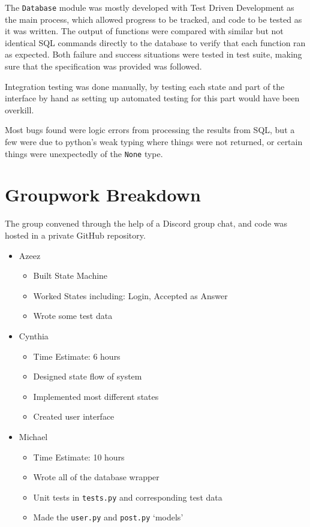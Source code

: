 \documentclass{article}
\begin{document}
The \verb|Database| module was mostly developed with Test Driven Development as the main process, which allowed progress to be tracked, and code to be tested as it was written. The output of functions were compared with similar but not identical SQL commands directly to the database to verify that each function ran as expected. Both failure and success situations were tested in test suite, making sure that the specification was provided was followed.

Integration testing was done manually, by testing each state and part of the interface by hand as setting up automated testing for this part would have been overkill.

Most bugs found were logic errors from processing the results from SQL, but a few were due to python's weak typing where things were not returned, or certain things were unexpectedly of the \verb|None| type.

\section{Groupwork Breakdown}

The group convened through the help of a Discord group chat, and code was hosted in a private GitHub repository.

\begin{itemize}
    \item Azeez
          \begin{itemize}
              \item Built State Machine
              \item Worked States including: Login, Accepted as Answer
              \item Wrote some test data
          \end{itemize}
    \item Cynthia
          \begin{itemize}
              \item Time Estimate: 6 hours
              \item Designed state flow of system
              \item Implemented most different states
              \item Created user interface
          \end{itemize}
    \item Michael
          \begin{itemize}
              \item Time Estimate: 10 hours
              \item Wrote all of the database wrapper
              \item Unit tests in \verb|tests.py| and corresponding test data
              \item Made the \verb|user.py| and \verb|post.py| `models'
          \end{itemize}
\end{itemize}
\end{document}
